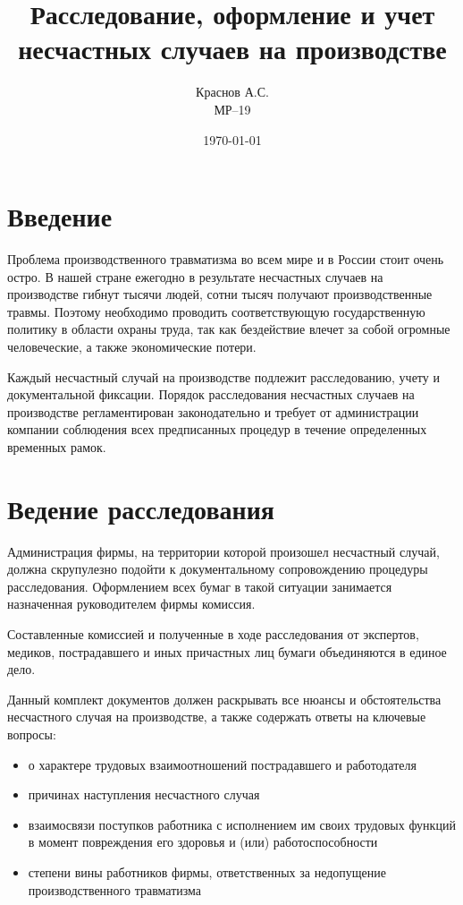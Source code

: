 \title{Расследование, оформление и учет несчастных случаев на производстве}
\author{Краснов А.С.\\МР--19}
\date{\today}
\maketitlepage

\section{Введение}
Проблема производственного травматизма во всем мире и в России стоит очень остро. В нашей стране ежегодно в результате несчастных случаев на производстве гибнут тысячи людей, сотни тысяч получают производственные травмы. Поэтому необходимо проводить соответствующую государственную политику в области охраны труда, так как бездействие влечет за собой огромные человеческие, а также экономические потери.


Каждый несчастный случай на производстве подлежит расследованию, учету и документальной фиксации. Порядок расследования несчастных случаев на производстве регламентирован законодательно и требует от администрации компании соблюдения всех предписанных процедур в течение определенных временных рамок.




\section{Ведение расследования}
Администрация фирмы, на территории которой произошел несчастный случай, должна скрупулезно подойти к документальному сопровождению процедуры расследования. Оформлением всех бумаг в такой ситуации занимается назначенная руководителем фирмы комиссия.


Составленные комиссией и полученные в ходе расследования от экспертов, медиков, пострадавшего и иных причастных лиц бумаги объединяются в единое дело.

Данный комплект документов должен раскрывать все нюансы и обстоятельства несчастного случая на производстве, а также содержать ответы на ключевые вопросы:
\begin{itemize}
    \item о характере трудовых взаимоотношений пострадавшего и работодателя
    \item причинах наступления несчастного случая
    \item взаимосвязи поступков работника с исполнением им своих трудовых функций в момент повреждения его здоровья и (или) работоспособности
    \item степени вины работников фирмы, ответственных за недопущение производственного травматизма
\end{itemize}

